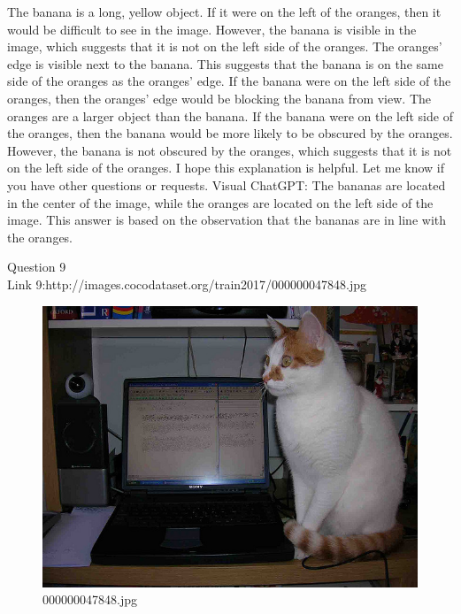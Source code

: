 \begin{enumerate}
        The banana is a long, yellow object. If it were on the left of the oranges, then it would be difficult to see in the image. However, the banana is visible in the image, which suggests that it is not on the left side of the oranges.
        The oranges' edge is visible next to the banana. This suggests that the banana is on the same side of the oranges as the oranges' edge. If the banana were on the left side of the oranges, then the oranges' edge would be blocking the banana from view.
        The oranges are a larger object than the banana. If the banana were on the left side of the oranges, then the banana would be more likely to be obscured by the oranges. However, the banana is not obscured by the oranges, which suggests that it is not on the left side of the oranges.
        I hope this explanation is helpful. Let me know if you have other questions or requests.
        \subitem Visual ChatGPT: The bananas are located in the center of the image, while the oranges are located on the left side of the image. This answer is based on the observation that the bananas are in line with the oranges.
    \end{enumerate}
Question 9\\
Link 9:http://images.cocodataset.org/train2017/000000047848.jpg
    \begin{figure}[h]
        \centering
        \includegraphics[width=0.8\linewidth]{../image set/easy/000000047848.jpg}
        \caption{000000047848.jpg}
    \end{figure}
